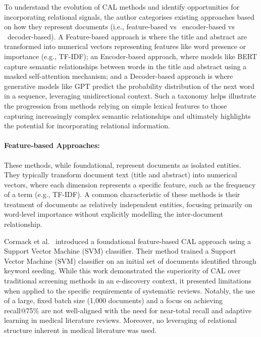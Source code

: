 \documentclass[10pt, english]{article}
\begin{document}
To understand the evolution of CAL methods and identify opportunities for incorporating relational signals, the author categorises existing approaches based on how they represent documents (i.e., feature-based vs \ encoder-based vs \ decoder-based). A Feature-based approach is where the title and abstract are transformed into numerical vectors representing features like word presence or importance (e.g., TF-IDF); an Encoder-based approach, where models like BERT capture semantic relationships between words in the title and abstract using a masked self-attention mechanism; and a Decoder-based approach is where generative models like GPT predict the probability distribution of the next word in a sequence, leveraging unidirectional context. Such a taxonomy helps illustrate the progression from methods relying on simple lexical features to those capturing increasingly complex semantic relationships and ultimately highlights the potential for incorporating relational information.

\paragraph{Feature-based Approaches: }

These methods, while foundational, represent documents as isolated entities. They typically transform document text (title and abstract) into numerical vectors, where each dimension represents a specific feature, such as the frequency of a term (e.g., TF-IDF). A common characteristic of these methods is their treatment of documents as relatively independent entities, focusing primarily on word-level importance without explicitly modelling the inter-document relationship.

Cormack et al.~\cite{cormack_evaluation_2014} introduced a foundational feature-based CAL approach using a Support Vector Machine (SVM) classifier. Their method trained a Support Vector Machine (SVM) classifier on an initial set of documents identified through keyword seeding. While this work demonstrated the superiority of CAL over traditional screening methods in an e-discovery context, it presented limitations when applied to the specific requirements of systematic reviews. Notably, the use of a large, fixed batch size (1,000 documents) and a focus on achieving recall@75\% are not well-aligned with the need for near-total recall and adaptive learning in medical literature reviews. Moreover, no leveraging of relational structure inherent in medical literature was used.
\end{document}
